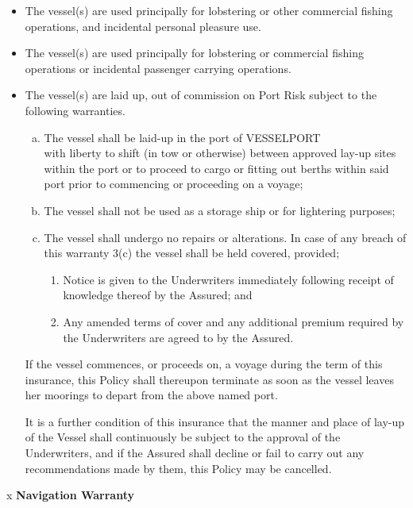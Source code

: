 \documentclass[10pt]{article}
\newcommand{\mybox}{\fboxsep=-.15pt\fbox{\rule{0pt}{2.5ex}\rule{2.5ex}{0pt}}}
\newcommand{\checkbox}[2]{%
    \ifthenelse{\equal{#1}{#2}}  
            {X}               
            {\mybox}
}
\newcommand\VesselItem{1}
\begin{document}
\begin{itemize}
    \item[\checkbox{1}{\VesselItem} 1.] The vessel(s) are used principally for lobstering or other commercial fishing operations, and incidental personal pleasure use. 
    \item[\checkbox{2}{\VesselItem} 2.] The vessel(s) are used principally for lobstering or commercial fishing operations or incidental passenger carrying operations.
    \item[\checkbox{3}{\VesselItem} 3.] The vessel(s) are laid up, out of commission on Port Risk subject to the following warranties.
    \begin{enumerate}[(a)]
        \item The vessel shall be laid-up in the port of VESSELPORT \\ with liberty to shift (in tow or otherwise) between approved lay-up sites within the port or to proceed to cargo or fitting out berths within said port prior to commencing or proceeding on a voyage;    
        \item The vessel shall not be used as a storage ship or for lightering purposes;
        \item The vessel shall undergo no repairs or alterations.  In case of any breach of this warranty 3(c) the vessel shall be held covered, provided;
        \begin{enumerate}[(1)]
            \item Notice is given to the Underwriters immediately following receipt of knowledge thereof by the Assured; and
            \item Any amended terms of cover and any additional premium required by the Underwriters are agreed to by the Assured.
        \end{enumerate}
    \end{enumerate}
    If the vessel commences, or proceeds on, a voyage during the term of this insurance, this Policy shall thereupon terminate as soon as the vessel leaves her moorings to depart from the above named port.

    It is a further condition of this insurance that the manner and place of lay-up of the Vessel shall continuously be subject to the approval of the Underwriters, and if the Assured shall decline or fail to carry out any recommendations made by them, this Policy may be cancelled. 
\end{itemize}

\vspace{\baselineskip}
x \hspace{0.25in} \textbf{Navigation Warranty}
\end{document}
